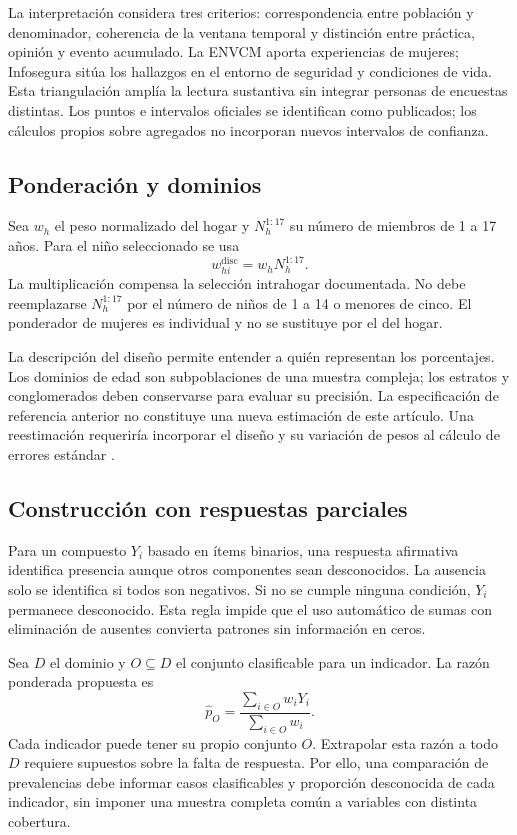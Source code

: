 \documentclass[11pt,a4paper]{article}
\begin{document}
La interpretación considera tres criterios: correspondencia entre población
y denominador, coherencia de la ventana temporal y distinción entre práctica,
opinión y evento acumulado. La ENVCM aporta experiencias de mujeres;
Infosegura sitúa los hallazgos en el entorno de seguridad y condiciones de
vida. Esta triangulación amplía la lectura sustantiva sin integrar personas
de encuestas distintas. Los puntos e intervalos oficiales se identifican
como publicados; los cálculos propios sobre agregados no incorporan nuevos
intervalos de confianza.

\subsection{Ponderación y dominios}
Sea $w_h$ el peso normalizado del hogar y $N_h^{1:17}$ su número de miembros
de 1 a 17 años. Para el niño seleccionado se usa
\begin{equation}
 w_{hi}^{\mathrm{disc}}=w_h N_h^{1:17}.
 \label{eq:peso}
\end{equation}
La multiplicación compensa la selección intrahogar documentada. No debe
reemplazarse $N_h^{1:17}$ por el número de niños de 1 a 14 o menores de cinco.
El ponderador de mujeres es individual y no se sustituye por el del hogar.

La descripción del diseño permite entender a quién representan los
porcentajes. Los dominios de edad son subpoblaciones de una muestra compleja;
los estratos y conglomerados deben conservarse para evaluar su precisión.
La especificación de referencia anterior no constituye una nueva estimación
de este artículo. Una reestimación requeriría incorporar el diseño y su
variación de pesos al cálculo de errores estándar \citep{lumley}.

\subsection{Construcción con respuestas parciales}
Para un compuesto $Y_i$ basado en ítems binarios, una respuesta afirmativa
identifica presencia aunque otros componentes sean desconocidos. La ausencia
solo se identifica si todos son negativos. Si no se cumple ninguna condición,
$Y_i$ permanece desconocido. Esta regla impide que el uso automático de
sumas con eliminación de ausentes convierta patrones sin información en ceros.

Sea $D$ el dominio y $O\subseteq D$ el conjunto clasificable para un indicador.
La razón ponderada propuesta es
\begin{equation}
 \widehat p_O=\frac{\sum_{i\in O}w_iY_i}{\sum_{i\in O}w_i}.
 \label{eq:prevalencia}
\end{equation}
Cada indicador puede tener su propio conjunto $O$. Extrapolar esta razón a
todo $D$ requiere supuestos sobre la falta de respuesta. Por ello, una
comparación de prevalencias debe informar casos clasificables y proporción
desconocida de cada indicador, sin imponer una muestra completa común a
variables con distinta cobertura.
\end{document}
